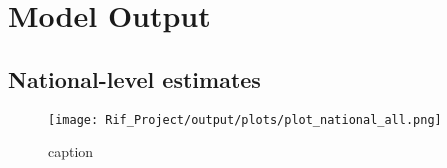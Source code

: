 \documentclass[
]{article}
\begin{document}
\hypertarget{model-output}{%
\section{Model Output}\label{model-output}}

\hypertarget{national-level-estimates}{%
\subsection{National-level estimates}\label{national-level-estimates}}

\begin{figure}
\centering
\texttt{[image: Rif\_Project/output/plots/plot\_national\_all.png]}
\caption{caption}
\end{figure}
\end{document}
